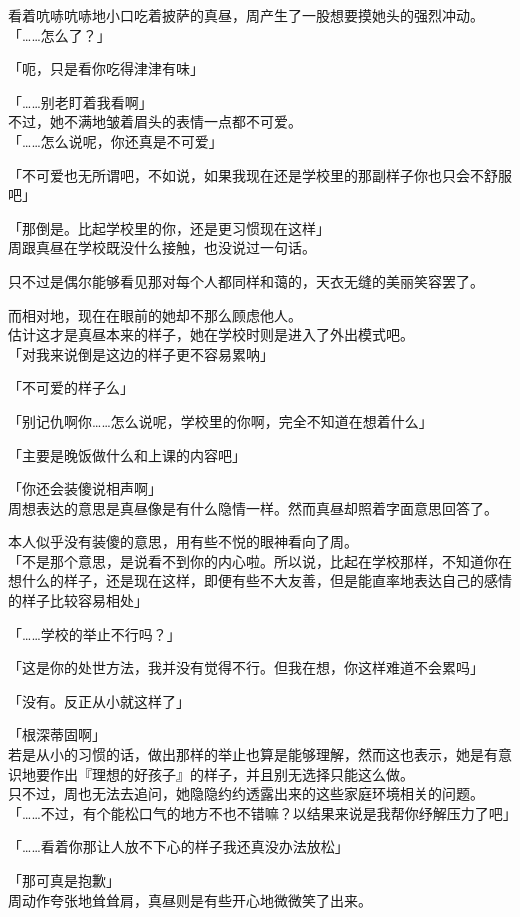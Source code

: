 看着吭哧吭哧地小口吃着披萨的真昼，周产生了一股想要摸她头的强烈冲动。\\

「……怎么了？」

「呃，只是看你吃得津津有味」

「……别老盯着我看啊」\\

不过，她不满地皱着眉头的表情一点都不可爱。\\

「……怎么说呢，你还真是不可爱」

「不可爱也无所谓吧，不如说，如果我现在还是学校里的那副样子你也只会不舒服吧」

「那倒是。比起学校里的你，还是更习惯现在这样」\\

周跟真昼在学校既没什么接触，也没说过一句话。

只不过是偶尔能够看见那对每个人都同样和蔼的，天衣无缝的美丽笑容罢了。

而相对地，现在在眼前的她却不那么顾虑他人。\\

估计这才是真昼本来的样子，她在学校时则是进入了外出模式吧。\\

「对我来说倒是这边的样子更不容易累呐」

「不可爱的样子么」

「别记仇啊你……怎么说呢，学校里的你啊，完全不知道在想着什么」

「主要是晚饭做什么和上课的内容吧」

「你还会装傻说相声啊」\\

周想表达的意思是真昼像是有什么隐情一样。然而真昼却照着字面意思回答了。

本人似乎没有装傻的意思，用有些不悦的眼神看向了周。\\

「不是那个意思，是说看不到你的内心啦。所以说，比起在学校那样，不知道你在想什么的样子，还是现在这样，即便有些不大友善，但是能直率地表达自己的感情的样子比较容易相处」

「……学校的举止不行吗？」

「这是你的处世方法，我并没有觉得不行。但我在想，你这样难道不会累吗」

「没有。反正从小就这样了」

「根深蒂固啊」\\

若是从小的习惯的话，做出那样的举止也算是能够理解，然而这也表示，她是有意识地要作出『理想的好孩子』的样子，并且别无选择只能这么做。\\

只不过，周也无法去追问，她隐隐约约透露出来的这些家庭环境相关的问题。\\

「……不过，有个能松口气的地方不也不错嘛？以结果来说是我帮你纾解压力了吧」

「……看着你那让人放不下心的样子我还真没办法放松」

「那可真是抱歉」\\

周动作夸张地耸耸肩，真昼则是有些开心地微微笑了出来。
